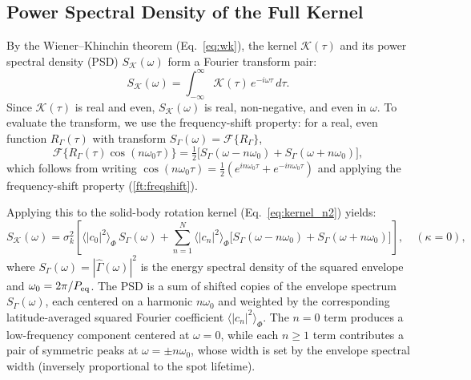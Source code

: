 \documentclass[preprint]{aastex702}
\newcommand{\FT}[1]{\hat{#1}}
\begin{document}
\subsection{Power Spectral Density of the Full Kernel} \label{subsec:psd}

By the Wiener--Khinchin theorem (Eq.~\ref{eq:wk}), the kernel $\mathcal{K}(\tau)$ and its power spectral density (PSD) $S_{\mathcal{K}}(\omega)$ form a Fourier transform pair:
\begin{equation}
    S_{\mathcal{K}}(\omega) = \int_{-\infty}^{\infty} \mathcal{K}(\tau)\, e^{-i\omega\tau}\, d\tau.
    \label{eq:psd_def}
\end{equation}
Since $\mathcal{K}(\tau)$ is real and even, $S_{\mathcal{K}}(\omega)$ is real, non-negative, and even in $\omega$. To evaluate the transform, we use the frequency-shift property: for a real, even function $R_\Gamma(\tau)$ with transform $S_\Gamma(\omega) = \mathcal{F}\{R_\Gamma\}$,
\begin{equation}
    \mathcal{F}\{R_\Gamma(\tau)\cos(n\omega_0\tau)\} = \tfrac{1}{2}\big[S_\Gamma(\omega - n\omega_0) + S_\Gamma(\omega + n\omega_0)\big],
\end{equation}
which follows from writing $\cos(n\omega_0\tau) = \tfrac{1}{2}(e^{in\omega_0\tau} + e^{-in\omega_0\tau})$ and applying the frequency-shift property (\ref{ft:freqshift}).

Applying this to the solid-body rotation kernel (Eq.~\ref{eq:kernel_n2}) yields:
\begin{equation}
    S_{\mathcal{K}}(\omega) = \sigma_k^2 \left[
        \langle |c_0|^2 \rangle_\Phi\, S_\Gamma(\omega)
        + \sum_{n=1}^{N} \langle |c_n|^2 \rangle_\Phi \Big[S_\Gamma(\omega - n\omega_0) + S_\Gamma(\omega + n\omega_0)\Big]
    \right],
    \quad (\kappa = 0),
    \label{eq:psd_solid}
\end{equation}
where $S_\Gamma(\omega) = |\FT{\Gamma}(\omega)|^2$ is the energy spectral density of the squared envelope and $\omega_0 = 2\pi/P_{\rm eq}$. The PSD is a sum of shifted copies of the envelope spectrum $S_\Gamma(\omega)$, each centered on a harmonic $n\omega_0$ and weighted by the corresponding latitude-averaged squared Fourier coefficient $\langle |c_n|^2 \rangle_\Phi$. The $n = 0$ term produces a low-frequency component centered at $\omega = 0$, while each $n \geq 1$ term contributes a pair of symmetric peaks at $\omega = \pm n\omega_0$, whose width is set by the envelope spectral width (inversely proportional to the spot lifetime).
\end{document}
